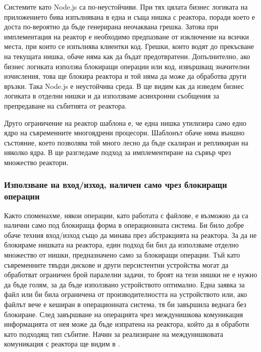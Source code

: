 Системите като Node.js са по-неустойчиви. При тях цялата бизнес логиката на приложението бива изпълнявана в една и съща нишка с реактора, поради което е доста по-вероятно да бъде генерирана неочаквана грешка. Затова при имплементация на реактор е необходимо предпазване от изключение на всички места, при които се изпълнява клиентки код. Грешки, които водят до прекъсване на текущата нишка, обаче няма как да бъдат предотвратени. Допълнително, ако бизнес логиката използва блокиращи операции или код, извършващ значителни изчисления, това ще блокира реактора и той няма да може да обработва други връзки. Така Node.js е неустойчива среда. В  ще видим как да изведем бизнес логиката в отделни нишки и да използваме асинхронни съобщения за препредаване на събитията от реактора.

Друго ограничение на реактор шаблона е, че една нишка утилизира само едно ядро на съвременните многоядрени процесори. Шаблонът обаче няма външно състояние, което позволява той много лесно да бъде скалиран и репликиран на няколко ядра. В  ще разгледаме подход за имплементиране на сървър чрез множество реактори.

\subsubsection{Използване на вход/изход, наличен само чрез блокиращи операции}

Както споменахме, някои операции, като работата с файлове, е възможно да са налични само под блокираща форма в операционната система. Би било добре обаче техния вход/изход също да минава през абстракцията на реактора. За да не блокираме нишката на реактора, един подход би бил да използваме отделно множество от нишки, предназначено само за блокиращи операции. Тъй като съвременните твърди дискове и други персистентни устройства могат да обработват ограничен брой паралелни задачи, то броят на тези нишки не е нужно да бъде голям, за да бъде използвано устройството оптимално. Една заявка за файл или би била ограничена от производителността на устройството или, ако файлът вече е кеширан в операционната система, тя би завършила веднага без блокиране. След завършване на операцията чрез междунишкова комуникация информацията от нея може да бъде изпратена на реактора, който да я обработи като подходящ тип събитие. Начин за реализиране на междунишковата комуникация с реактора ще видим в .

